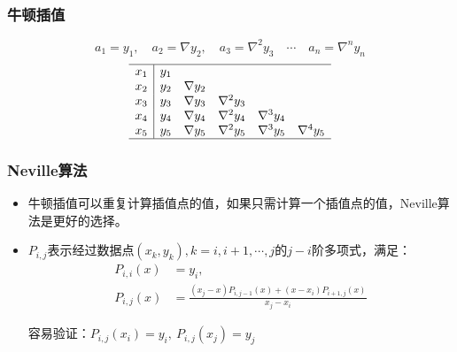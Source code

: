 \documentclass[red,compress]{beamer}
\begin{document}
\begin{frame}
\frametitle{牛顿插值}

\begin{equation*}
	a_1=y_1, \quad a_2=\nabla y_2, \quad a_3=\nabla^2y_3 \quad \cdots \quad a_n=\nabla^ny_n
\end{equation*}
\begin{equation*}
\begin{array}{c|*{5}c}
\hline
x_1 & y_1 & 	       &              &              & \\
x_2 & y_2 & \nabla y_2 &              &              & \\
x_3 & y_3 & \nabla y_3 & \nabla^2 y_3 &              & \\
x_4 & y_4 & \nabla y_4 & \nabla^2 y_4 & \nabla^3 y_4 & \\
x_5 & y_5 & \nabla y_5 & \nabla^2 y_5 & \nabla^3 y_5 & \nabla^4 y_5 \\
\hline 
\end{array}
\end{equation*}

\end{frame}

\begin{frame}
\frametitle{Neville算法}
\begin{itemize}
\item
牛顿插值可以重复计算插值点的值，如果只需计算一个插值点的值，Neville算法是更好的选择。

\item
$P_{i,j}$表示经过数据点$(x_k,y_k),k=i,i+1,\cdots,j$的$j-i$阶多项式，满足：
\begin{align*}
	P_{i,i}(x) &= y_i, \\
	P_{i,j}(x) &= \frac{(x_j-x)P_{i,j-1}(x)+(x-x_i)P_{i+1,j}(x)}{x_j-x_i}
\end{align*}

容易验证：$P_{i,j}(x_i)=y_i,\: P_{i,j}(x_j)=y_j$
\end{itemize}
\end{frame}
\end{document}
